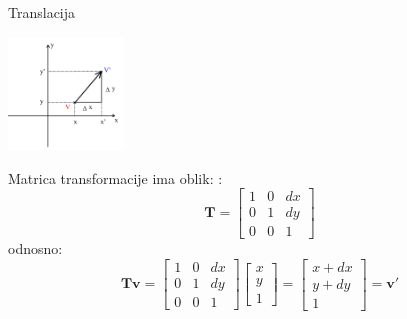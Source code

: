 \documentclass[9pt]{beamer}
\begin{document}



\begin{frame}{Translacija}
	\begin{center}
		\includegraphics[height=3cm]{slike/2dtranslacija.png}
	\end{center}
	Matrica transformacije ima oblik: :
	\begin{equation}
	\mathbf{T} = 
	\left[ \begin{array}{ccc}
	1 & 0 & dx\\
	0 & 1 & dy \\
	0 & 0 & 1 \end{array} \right] 
	\nonumber
	\end{equation}
	odnosno:
	\begin{equation}
	\mathbf{Tv} = 
	\left[ \begin{array}{ccc}
	1 & 0 & dx\\
	0 & 1 & dy \\
	0 & 0 & 1 \end{array} \right] 
	\left[ \begin{array}{c}
	x\\
	y \\
	1 \end{array} \right] = 
	\left[ \begin{array}{c}
	x+dx\\
	y+dy \\
	1 \end{array} \right] = \mathbf{v'}
	\nonumber
	\end{equation}
\end{frame}
\end{document}
